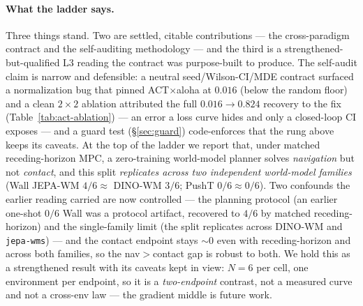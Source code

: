 \documentclass[10pt]{article}
\begin{document}
\paragraph{What the ladder says.}
Three things stand. Two are settled, citable contributions --- the
cross-paradigm contract and the self-auditing methodology --- and the
third is a strengthened-but-qualified L3 reading the contract was
purpose-built to produce. The self-audit claim is narrow and defensible: a
neutral seed/Wilson-CI/MDE contract surfaced a normalization bug that
pinned ACT$\times$aloha at $0.016$ (below the random floor) and a clean
$2{\times}2$ ablation attributed the full $0.016\to0.824$ recovery to the
fix (Table~\ref{tab:act-ablation}) --- an error a loss curve hides and only
a closed-loop CI exposes --- and a guard test (\S\ref{sec:guard})
code-enforces that the rung above keeps its caveats. At the top of the
ladder we report that, under matched receding-horizon MPC, a zero-training
world-model planner solves \emph{navigation} but not \emph{contact}, and
this split \emph{replicates across two independent world-model families}
(Wall JEPA-WM $4/6 \approx$ DINO-WM $3/6$; PushT $0/6 \approx 0/6$). Two
confounds the earlier reading carried are now controlled --- the planning
protocol (an earlier one-shot $0/6$ Wall was a protocol artifact, recovered
to $4/6$ by matched receding-horizon) and the single-family limit (the
split replicates across DINO-WM and \texttt{jepa-wms}) --- and the contact
endpoint stays ${\sim}0$ even with receding-horizon and across both
families, so the nav$>$contact gap is robust to both. We hold this as a
strengthened result with its caveats kept in view: $N{=}6$ per cell, one
environment per endpoint, so it is a \emph{two-endpoint} contrast, not a
measured curve and not a cross-env law --- the gradient middle is future
work.
\end{document}
